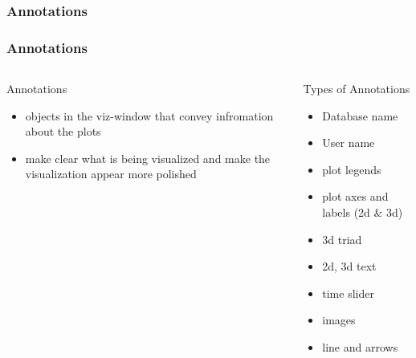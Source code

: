 \subsubsection{Annotations}
\begin{frame}
\frametitle{Annotations}
\begin{columns}
\begin{column}{5cm}
\begin{block}{Annotations}
\begin{itemize}
	\item objects in the viz-window
		that convey infromation about the plots
	\item make clear what is being visualized and make
		the visualization appear more polished
\end{itemize}
\end{block}
\end{column}
\begin{column}{5cm}
\begin{block}{Types of Annotations}
\begin{itemize}
        \item Database name
        \item User name
	\item plot legends
	\item plot axes and labels (2d \& 3d)
	\item 3d triad
	\item 2d, 3d text
	\item time slider
	\item images
	\item line and arrows
\end{itemize}
\end{block}
\end{column}
\end{columns}
\end{frame}



